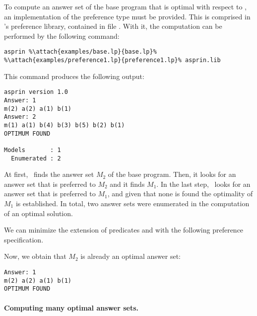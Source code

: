 \begin{example}
To compute an answer set of the base program that is optimal with respect to , 
an implementation of the preference type  must be provided.
This is comprised in \asprin's preference library,
contained in file .
With it, the computation can be performed by the following command:
%
%
\begin{lstlisting}[numbers=none,escapechar=\%]
asprin %\attach{examples/base.lp}{base.lp}% %\attach{examples/preference1.lp}{preference1.lp}% asprin.lib
\end{lstlisting}
%
This command produces the following output:
%
\begin{lstlisting}[numbers=none]
asprin version 1.0
Answer: 1
m(2) a(2) a(1) b(1)
Answer: 2
m(1) a(1) b(4) b(3) b(5) b(2) b(1)
OPTIMUM FOUND

Models       : 1
  Enumerated : 2

\end{lstlisting}
%
At first, \asprin\ finds the answer set $M_2$ of the base program. 
Then, it looks for an answer set that is preferred to $M_2$ and it finds $M_1$. 
In the last step, \asprin\ looks for an answer set that is preferred to $M_1$,  
and given that none is found the optimality of $M_1$ is established. 
In total, two answer sets were enumerated in the computation of an optimal solution.

We can minimize the extension of predicates  and  with the following preference specification.
%

%
Now, we obtain that $M_2$ is already an optimal answer set: 
\begin{lstlisting}[numbers=none]
Answer: 1
m(2) a(2) a(1) b(1)
OPTIMUM FOUND
\end{lstlisting}
\end{example}

\paragraph{Computing many optimal answer sets.}

